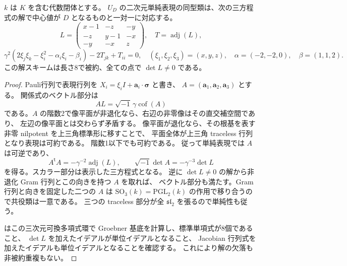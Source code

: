 \begin{proposition}[二次元単純表現の完全なtrace表示]
\label{prop:order4-two-dimensional-traces}
$k$ は $K$ を含む代数閉体とする。
$U_D$ の二次元単純表現の同型類は、次の三方程式の解で中心値が $D$ となるものと一対一に対応する。
\[
 L=\begin{pmatrix}x-1&-z&-y\\-z&y-1&-x\\-y&-x&z\end{pmatrix},\quad T=\operatorname{adj}(L),
\]
\[
 \gamma^2(2\xi_j\xi_k-\xi_i^2-\alpha_i\xi_i-\beta_i)-2T_{jk}+T_{ii}=0,
 \quad(\xi_1,\xi_2,\xi_3)=(x,y,z),\quad
 \alpha=(-2,-2,0),\quad\beta=(1,1,2).
\]
この解スキームは長さ8で被約、全ての点で $\det L\ne0$ である。
\end{proposition}
\begin{proof}
Pauli行列で表現行列を $X_i=\xi_i I+\mathbf a_i\cdot\boldsymbol\sigma$ と書き、
$A=(\mathbf a_1,\mathbf a_2,\mathbf a_3)$ とする。
関係式のベクトル部分は
\[
 A L=\sqrt{-1}\,\gamma\operatorname{cof}(A)
\]
である。$A$ の階数2で像平面が非退化なら、右辺の非零像はその直交補空間であり、
左辺の像平面とは交わらず矛盾する。
像平面が退化なら、その根基を表す非零 nilpotent を上三角標準形に移すことで、
平面全体が上三角 traceless 行列となり表現は可約である。
階数1以下でも可約である。
従って単純表現では $A$ は可逆であり、
\[
 A^{\mathsf t}A=-\gamma^{-2}\operatorname{adj}(L),\qquad
 \sqrt{-1}\det A=-\gamma^{-3}\det L
\]
を得る。スカラー部分は表示した三方程式となる。
逆に $\det L\ne0$ の解から非退化 Gram 行列とこの向きを持つ $A$ を取れば、
ベクトル部分も満たす。Gram 行列と向きを固定した二つの $A$ は
$\mathrm{SO}_3(k)=\mathrm{PGL}_2(k)$ の作用で移り合うので共役類は一意である。
三つの traceless 部分が全 $\mathfrak{sl}_2$ を張るので単純性も従う。

 はこの三次元可換多項式環で
Groebner 基底を計算し、標準単項式が8個であること、
$\det L$ を加えたイデアルが単位イデアルとなること、
Jacobian 行列式を加えたイデアルも単位イデアルとなることを確認する。
これにより解の欠落も非被約重複もない。
\end{proof}

